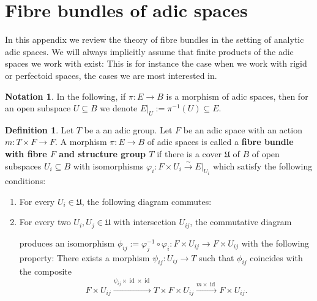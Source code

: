 \documentclass[10pt,oneside]{amsart}
\theoremstyle{definition}
\newtheorem{definition}[theorem]{Definition}
\newtheorem{notation}[theorem]{Notation}
\begin{document}
	
		\appendix
	\section{Fibre bundles of adic spaces}\label{s:appendix}
	In this appendix we review the theory of fibre bundles in the setting of analytic adic spaces. We will always implicitly assume that finite products of the adic spaces we work with exist: This is for instance the case when we work with rigid or perfectoid spaces, the cases we are most interested in.

	\begin{notation}
		In the following, if $\pi\colon E\rightarrow B$ is a morphism of adic spaces, then for an open subspace $U\subseteq B$ we denote $E|_U:=\pi^{-1}(U)\subseteq E$.
	\end{notation}
	\begin{definition}\label{definition principal T-bundle}
		Let $T$ be a an adic group. Let $F$ be an adic space with an action $m\colon T\times F\rightarrow F$.
		A morphism $\pi\colon E\rightarrow B$ of adic spaces is called a \textbf{fibre bundle with fibre $F$ and structure group $T$} if there is a cover $\mathfrak U$ of $B$ of open subspaces $U_i\subseteq B$ with isomorphisms $\varphi_i:F\times U_i \xrightarrow{\sim} E|_{U_i}$ which satisfy the following conditions:
		\begin{enumerate}[label=(\alph*)]
			\item For every $U_i\in \mathfrak U$, the following diagram commutes:
			\begin{center}
			\end{center}
			\item For every two $U_i,U_j\in \mathfrak U$ with intersection $U_{ij}$, the commutative diagram
			\begin{center}
			\end{center}
			produces an isomorphism $\phi_{ij}:=\varphi_j^{-1}\circ\varphi_i\colon F\times U_{ij}\rightarrow F\times U_{ij}$ with the following property: There exists a morphism $\psi_{ij}:U_{ij}\rightarrow T$ such that $\phi_{ij}$ coincides with the composite
			\[F\times U_{ij} \xrightarrow{\psi_{ij}\times \operatorname{id}\times\operatorname{id}} T\times F\times U_{ij}\xrightarrow{m\times \operatorname{id}} F\times U_{ij}.\]
		\end{enumerate}
	\end{definition}
\end{document}
